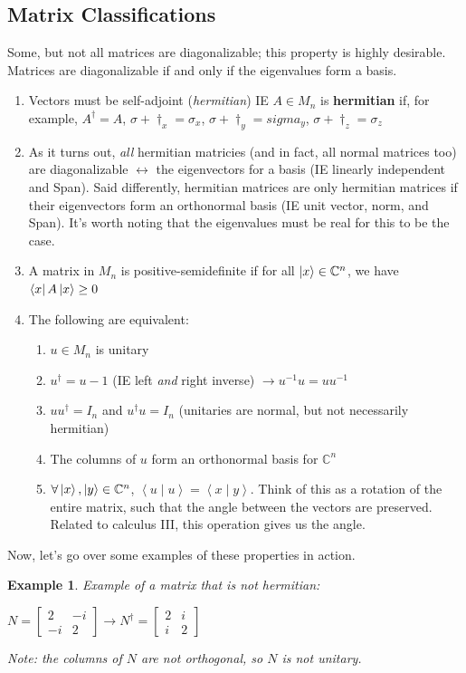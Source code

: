 \documentclass[12pt]{article}
\theoremstyle{plain}
\theoremstyle{nonumberplain}
\theoremstyle{plain}
\newtheorem{example}[lemma]{Example}
\theoremstyle{nonumberplain}
\newcommand\1{{\bf 1}}
\newcommand{\bmat}[1]{\begin{bmatrix*} #1 \end{bmatrix*}} %
\newcommand{\C}{\mathbb{C}} %
\newcommand{\<}{\left\langle}
\renewcommand{\>}{\right\rangle}
\newcommand{\inp}[2]{\left\langle#1\mid #2\right\rangle} %
\begin{document}
\subsection{Matrix Classifications}
Some, but not all matrices are diagonalizable; this property is highly desirable. Matrices are diagonalizable if and only if the eigenvalues form a basis. \\
\begin{enumerate}
\item Vectors must be self-adjoint (\textit{hermitian}) IE $A\in M_n$ is \textbf{hermitian} if, for example, $A^\dagger=A$, $\sigma+\dagger_x=\sigma_x$, $\sigma+\dagger_y=sigma_y$, $\sigma+\dagger_z=\sigma_z$
\item As it turns out, \textit{all} hermitian matricies (and in fact, all normal matrices too) are diagonalizable $\longleftrightarrow$ the eigenvectors for a basis (IE linearly independent and Span). Said differently, hermitian matrices are only hermitian matrices if their eigenvectors form an orthonormal basis (IE unit vector, norm, and Span). It's worth noting that the eigenvalues must be real for this to be the case.
\item A matrix in $M_n$ is positive-semidefinite if for all $\ket{x}\in\C^n$, we have $\bra{x}A\ket{x}\geq0$
\item The following are equivalent:
\begin{enumerate}
\item $u\in M_n$ is unitary
\item $u^\dagger=u-1$ (IE left \textit{and} right inverse) $\longrightarrow u^{-1}u=uu^{-1}$
\item $uu^\dagger=I_n$ and $u^\dagger u=I_n$ (unitaries are normal, but not necessarily hermitian)
\item The columns of $u$ form an orthonormal basis for $\C^n$
\item $\forall\ket{x},\ket{y}\in\C^n$, $\inp{u}{u}=\inp{x}{y}$. Think of this as a rotation of the entire matrix, such that the angle between the vectors are preserved. Related to calculus III, this operation gives us the angle.
\end{enumerate}
\end{enumerate}
Now, let's go over some examples of these properties in action.
\begin{example}
Example of a matrix that is \textit{not} hermitian:
\begin{center}
$N=\bmat{2 & -i \\ -i & 2}\longrightarrow N^\dagger=\bmat{2 & i \\ i & 2}$
\end{center} Note: the columns of $N$ are not orthogonal, so $N$ is not unitary.
\end{example}
\end{document}
